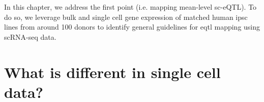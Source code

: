 In this chapter, we address the first point (i.e. mapping mean-level sc-eQTL).
To do so, we leverage bulk and single cell gene expression of matched human \gls{ipsc} lines from around 100 donors to identify general guidelines for \gls{eqtl} mapping using scRNA-seq data.

\newpage

\section{What is different in single cell data?}

